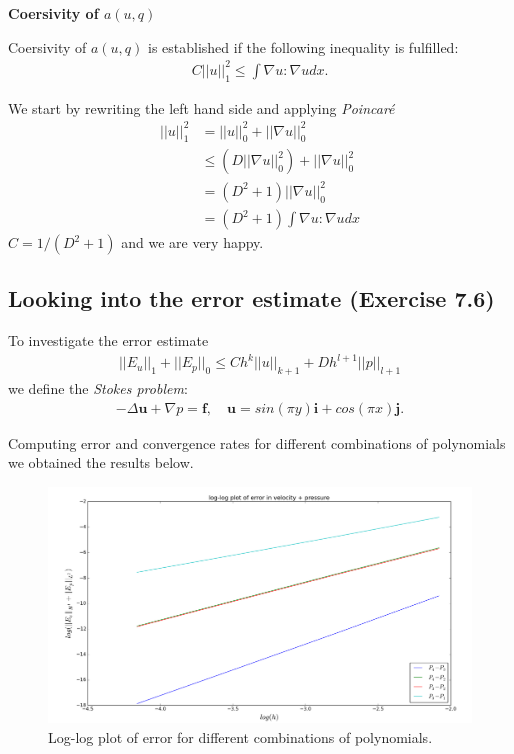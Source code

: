 \documentclass[11pt,a4paper,english]{article}
\numberwithin{equation}{section}
\begin{document}
 
\newpage

\textbf{Coersivity of $a(u,q)$}

Coersivity of $a(u,q)$ is established if the following inequality is fulfilled:
\begin{align*}
C||u||_1^2 \leq \int \nabla u : \nabla u dx. 
\end{align*}

We start by rewriting the left hand side and applying \emph{Poincaré}
\begin{align*}
||u||_1^2 &= ||u||_0^2 + ||\nabla u||_0^2 \\
 &\leq (D||\nabla u||_0^2)+||\nabla u||_0^2 \\
 &= (D^2+1)||\nabla u||^2_0 \\
 &=  (D^2+1)\int \nabla u : \nabla u dx
\end{align*}
$C = 1/(D^2+1)$ and we are very happy. 

\newpage

\subsection{Looking into the error estimate (Exercise 7.6)}

To investigate the error estimate
\begin{align*}
||E_u||_1 + ||E_p||_0 \leq Ch^k ||u||_{k+1} + Dh^{l+1}||p||_{l+1}
\end{align*}
we define the \emph{Stokes problem}:
\begin{align*}
-\Delta \mathbf{u} + \nabla p = \mathbf{f}, \quad \mathbf{u} = sin(\pi y) \mathbf{i} + cos(\pi x) \mathbf{j}.
\end{align*}

Computing error and convergence rates for different combinations of polynomials we obtained the results below. 

\begin{figure}[h!] 
\begin{center}
  \includegraphics[scale=0.25]{stokes_loglog.png}
  \end{center}
  \caption{Log-log plot of error for different combinations of polynomials.}
   \label{fig:stokes}
\end{figure}
\end{document}
